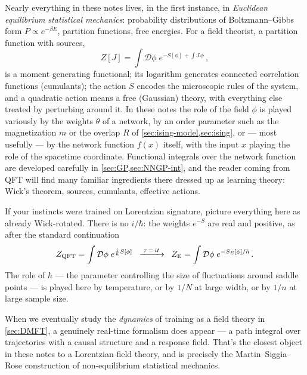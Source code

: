 \documentclass[11pt]{article}
\begin{document}
Nearly everything in these notes lives, in the first instance, in \emph{Euclidean equilibrium statistical mechanics}: probability distributions of Boltzmann--Gibbs form $P \propto e^{-\beta E}$, partition functions, free energies. For a field theorist, a partition function with sources,
%
\begin{equation}
    Z[J] = \int \mathcal{D}\phi\; e^{-S[\phi] \,+ \int J\,\phi}\,,
\end{equation}
%
is a moment generating functional; its logarithm generates connected correlation functions (cumulants); the action $S$ encodes the microscopic rules of the system, and a quadratic action means a free (Gaussian) theory, with everything else treated by perturbing around it. In these notes the role of the field $\phi$ is played variously by the weights $\theta$ of a network, by an order parameter such as the magnetization $m$ or the overlap $R$ of \cref{sec:ising-model,sec:ising}, or --- most usefully --- by the network function $f(x)$ itself, with the input $x$ playing the role of the spacetime coordinate. Functional integrals over the network function are developed carefully in \cref{sec:GP,sec:NNGP-int}, and the reader coming from QFT will find many familiar ingredients there dressed up as learning theory: Wick's theorem, sources, cumulants, effective actions.

If your instincts were trained on Lorentzian signature, picture everything here as already Wick-rotated. There is no $i/\hbar$: the weights $e^{-S}$ are real and positive, as after the standard continuation
%
\begin{equation}
    Z_{\rm QFT} =  \int \mathcal{D} \phi\; e^{\frac{i}{\hbar} S[\phi]} \;\;\xrightarrow{\;\tau\,=\,it\;}\;\; Z_{\rm E} = \int \mathcal{D} \phi\; e^{- S_E [\phi]/\hbar}\,.
\end{equation}
%
The role of $\hbar$ --- the parameter controlling the size of fluctuations around saddle points --- is played here by temperature, or by $1/N$ at large width, or by $1/n$ at large sample size.

When we eventually study the \emph{dynamics} of training as a field theory in \cref{sec:DMFT}, a genuinely real-time formalism does appear --- a path integral over trajectories with a causal structure and a response field. That's the closest object in these notes to a Lorentzian field theory, and is precisely the Martin--Siggia--Rose construction of non-equilibrium statistical mechanics.
\end{document}
